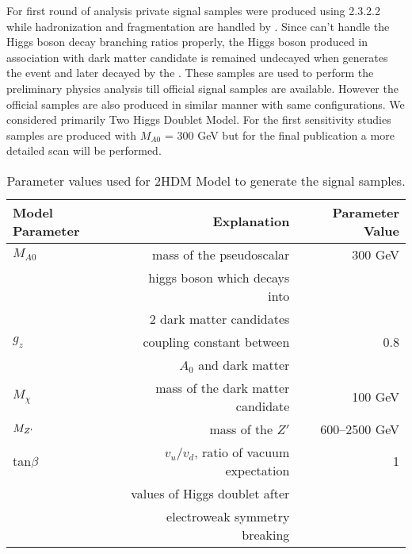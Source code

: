 For first round of analysis private signal samples were  produced using  2.3.2.2 \cite{bib:MADGRAPH} while hadronization and
 fragmentation are handled by  \cite{bib:PYTHIA}. Since \MADGRAPH can't handle the Higgs boson decay branching ratios properly, the Higgs boson produced in association with dark matter 
candidate is remained undecayed when \MADGRAPH generates the event and later decayed by the \PYTHIA. These samples are used to perform the preliminary physics 
analysis till official signal samples 
are available. However the official samples are also produced in similar manner with same configurations. 
We considered primarily Two Higgs Doublet Model. For the first sensitivity studies samples are produced with  $M_{A0}$ = 300 GeV but for the final 
publication a more detailed scan will be performed. 

\begin{table}[htbp]
\footnotesize
\centering 
\begin{tabular}{lrr}
\hline
\textbf{Model Parameter}  & \textbf{Explanation} & \textbf{Parameter Value} \\
\hline
\hline
$M_{A0}$      & mass of the pseudoscalar  &  300 GeV\\
              & higgs boson which decays into        &    \\
              & 2 dark matter candidates             &    \\
\hline
$g_{z}$       & coupling constant between            &  0.8    \\
              &  $A_{0}$ and dark matter             &       \\
\hline
$M_{\chi}$    & mass of the dark matter candidate &  100 GeV \\
\hline
$M_{Z`}$      & mass of the $Z'$ &  600--2500 GeV \\
\hline
tan$\beta$    & $v_{u}/v_{d}$, ratio of vacuum expectation &  1 \\
   & values of Higgs doublet after &  \\
  &  electroweak symmetry breaking &  \\
\hline
\hline
\end{tabular}
\caption{Parameter values used for 2HDM Model to generate the signal samples.}
\label{tab:modelparameters}
\end{table}

